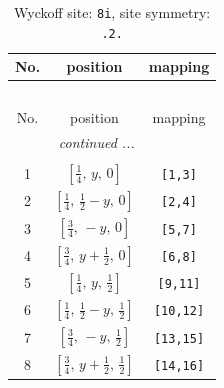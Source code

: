 \documentclass[fleqn,8pt]{jsarticle}
\begin{document}
\begin{longtable}{ccc}
\caption{Wyckoff site: {\tt 8i}, site symmetry: {\tt .2.}}
 \\
 \hline \hline
No. & position & mapping \\ \hline \endfirsthead

\multicolumn{2}{l}{\tablename\ \thetable{}} \\
 \hline \hline
No. & position & mapping \\ \hline \endhead

 \hline \hline
\multicolumn{2}{r}{\footnotesize\it continued ...} \\ \endfoot

 \hline \hline
\multicolumn{2}{r}{} \\ \endlastfoot

1 & $\left[ \frac{1}{4},\, y,\, 0 \right]$ & {\tt [1,3]} \\ \hline
2 & $\left[ \frac{1}{4},\, \frac{1}{2} - y,\, 0 \right]$ & {\tt [2,4]} \\ \hline
3 & $\left[ \frac{3}{4},\, - y,\, 0 \right]$ & {\tt [5,7]} \\ \hline
4 & $\left[ \frac{3}{4},\, y + \frac{1}{2},\, 0 \right]$ & {\tt [6,8]} \\ \hline
5 & $\left[ \frac{1}{4},\, y,\, \frac{1}{2} \right]$ & {\tt [9,11]} \\ \hline
6 & $\left[ \frac{1}{4},\, \frac{1}{2} - y,\, \frac{1}{2} \right]$ & {\tt [10,12]} \\ \hline
7 & $\left[ \frac{3}{4},\, - y,\, \frac{1}{2} \right]$ & {\tt [13,15]} \\ \hline
8 & $\left[ \frac{3}{4},\, y + \frac{1}{2},\, \frac{1}{2} \right]$ & {\tt [14,16]} \\
\end{longtable}
\renewcommand{\arraystretch}{1.2}
\end{document}
